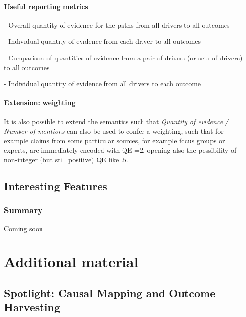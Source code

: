 \documentclass[
]{book}
\begin{document}
\hypertarget{useful-reporting-metrics}{%
\subsection{Useful reporting metrics}\label{useful-reporting-metrics}}

- Overall quantity of evidence for the paths from all drivers to all outcomes

- Individual quantity of evidence from each driver to all outcomes

- Comparison of quantities of evidence from a pair of drivers (or sets of drivers) to all outcomes

- Individual quantity of evidence from all drivers to each outcome

\textbf{
}

\hypertarget{extension-weighting}{%
\subsection{Extension: weighting}\label{extension-weighting}}

It is also possible to extend the semantics such that \emph{Quantity of evidence / Number of mentions} can also be used to confer a weighting, such that for example claims from some particular sources, for example focus groups or experts, are immediately encoded with QE =2, opening also the possibility of non-integer (but still positive) QE like .5.

\hypertarget{interesting-features}{%
\chapter{Interesting Features}\label{interesting-features}}

\hypertarget{summary-3}{%
\section{Summary}\label{summary-3}}

Coming soon

\hypertarget{part-additional-material}{%
\part{Additional material}\label{part-additional-material}}

\hypertarget{spotlight-causal-mapping-and-outcome-harvesting}{%
\chapter{Spotlight: Causal Mapping and Outcome Harvesting}\label{spotlight-causal-mapping-and-outcome-harvesting}}
\end{document}
